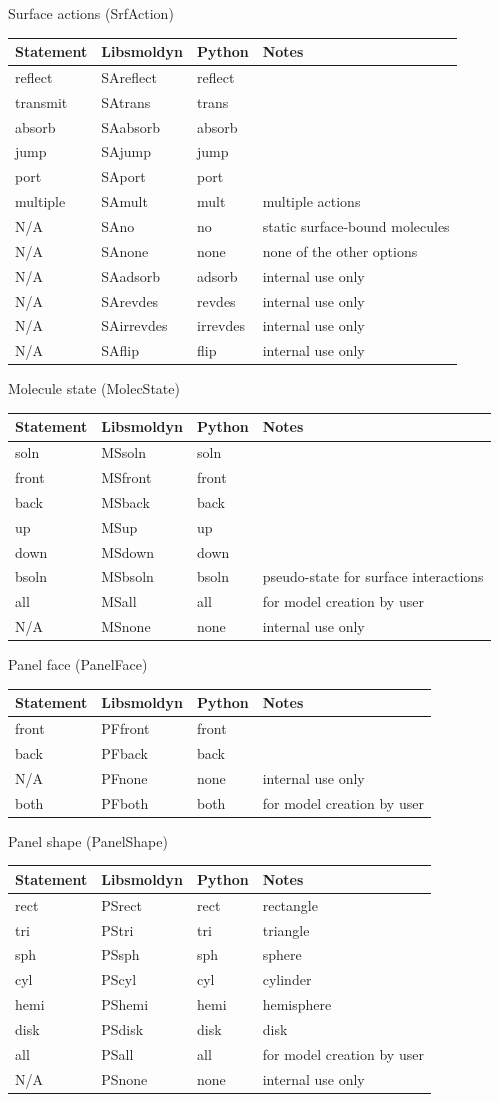 \documentclass {scrbook}
\begin{document}
Surface actions (SrfAction)
\begin{longtable}[c]{llll}
Statement & Libsmoldyn & Python & Notes\\
\hline
reflect & SAreflect & reflect\\
transmit & SAtrans & trans\\
absorb & SAabsorb & absorb\\
jump & SAjump & jump\\
port & SAport & port\\
multiple & SAmult & mult & multiple actions\\
N/A & SAno & no & static surface-bound molecules\\
N/A & SAnone & none & none of the other options\\
N/A & SAadsorb & adsorb & internal use only\\
N/A & SArevdes & revdes & internal use only\\
N/A & SAirrevdes & irrevdes & internal use only\\
N/A & SAflip & flip & internal use only
\end{longtable}

Molecule state (MolecState)
\begin{longtable}[c]{llll}
Statement & Libsmoldyn & Python & Notes\\
\hline
soln & MSsoln & soln\\
front & MSfront & front\\
back & MSback & back\\
up & MSup & up\\
down & MSdown & down\\
bsoln & MSbsoln & bsoln & pseudo-state for surface interactions\\
all & MSall & all & for model creation by user\\
N/A & MSnone & none & internal use only
\end{longtable}

Panel face (PanelFace)
\begin{longtable}[c]{llll}
Statement & Libsmoldyn & Python & Notes\\
\hline
front & PFfront & front\\
back & PFback & back\\
N/A & PFnone & none & internal use only\\
both & PFboth & both & for model creation by user
\end{longtable}

Panel shape (PanelShape)
\begin{longtable}[c]{llll}
Statement & Libsmoldyn & Python & Notes\\
\hline
rect & PSrect & rect & rectangle\\
tri & PStri & tri & triangle\\
sph & PSsph & sph & sphere\\
cyl & PScyl & cyl & cylinder\\
hemi & PShemi & hemi & hemisphere\\
disk & PSdisk & disk & disk\\
all & PSall & all & for model creation by user\\
N/A & PSnone & none & internal use only
\end{longtable}
\end{document}
